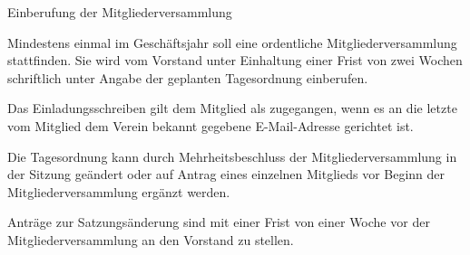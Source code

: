 \begin{para}{Einberufung der Mitgliederversammlung}
	\item Mindestens einmal im Geschäftsjahr soll eine ordentliche Mitgliederversammlung stattfinden. Sie wird vom Vorstand unter Einhaltung einer Frist von zwei Wochen schriftlich unter Angabe der geplanten Tagesordnung einberufen.
	\item Das Einladungsschreiben gilt dem Mitglied als zugegangen, wenn es an die letzte vom Mitglied dem Verein bekannt gegebene E-Mail-Adresse gerichtet ist.
	\item Die Tagesordnung kann durch Mehrheitsbeschluss der Mitgliederversammlung in der Sitzung geändert oder auf Antrag eines einzelnen Mitglieds vor Beginn der Mitgliederversammlung ergänzt werden.
	\item Anträge zur Satzungsänderung sind mit einer Frist von einer Woche vor der Mitgliederversammlung an den Vorstand zu stellen.
\end{para}

